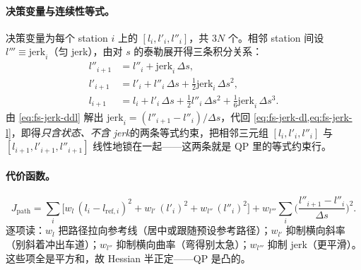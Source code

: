 \paragraph{决策变量与连续性等式。}
决策变量为每个 station $i$ 上的 $[l_i,l'_i,l''_i]$，共 $3N$ 个。相邻 station 间设 $l'''\equiv\mathrm{jerk}_i$（匀 jerk），由对 $s$ 的泰勒展开得三条积分关系：
\begin{align}
  l''_{i+1} &= l''_i+\mathrm{jerk}_i\,\Delta s, \label{eq:fs-jerk-ddl}\\
  l'_{i+1}  &= l'_i+l''_i\,\Delta s+\tfrac12\mathrm{jerk}_i\,\Delta s^2, \label{eq:fs-jerk-dl}\\
  l_{i+1}   &= l_i+l'_i\,\Delta s+\tfrac12 l''_i\,\Delta s^2+\tfrac16\mathrm{jerk}_i\,\Delta s^3. \label{eq:fs-jerk-l}
\end{align}
由 \cref{eq:fs-jerk-ddl} 解出 $\mathrm{jerk}_i=(l''_{i+1}-l''_i)/\Delta s$，代回 \cref{eq:fs-jerk-dl,eq:fs-jerk-l}，即得\emph{只含状态、不含 jerk}的两条等式约束，把相邻三元组 $[l_i,l'_i,l''_i]$ 与 $[l_{i+1},l'_{i+1},l''_{i+1}]$ 线性地锁在一起——这两条就是 QP 里的等式约束行。

\paragraph{代价函数。}
\begin{equation}
  J_{\mathrm{path}}=\sum_i\Big[w_l\,(l_i-l_{\mathrm{ref},i})^2+w_{l'}\,(l'_i)^2+w_{l''}\,(l''_i)^2\Big]
  +w_{l'''}\sum_i\Big(\frac{l''_{i+1}-l''_i}{\Delta s}\Big)^2.
  \label{eq:fs-path-cost}
\end{equation}
逐项读：$w_l$ 把路径拉向参考线（居中或跟随预设参考路径）；$w_{l'}$ 抑制横向斜率（别斜着冲出车道）；$w_{l''}$ 抑制横向曲率（弯得别太急）；$w_{l'''}$ 抑制 jerk（更平滑）。这些项全是平方和，故 Hessian 半正定——QP 是凸的。

